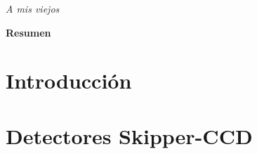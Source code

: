 \documentclass[a4paper,12pt]{report}
\begin{document}
\newpage
\thispagestyle{empty}
 \vspace*{150pt}
\begin{flushright}
\textit{A mis viejos}
\end{flushright}
\newpage
\thispagestyle{empty} \mbox{}
\thispagestyle{empty}


\newpage
\thispagestyle{empty}
\begin{center}\large{\textbf{Resumen}}\end{center}


\newpage
\thispagestyle{empty} \mbox{}
\thispagestyle{empty}

\newpage
{} %
\setcounter{page}{1}  %
\tableofcontents %
\newpage
\thispagestyle{empty} \mbox{}
\thispagestyle{empty}

\newpage
{}  %
\setcounter{page}{1}    %
\singlespace
\chapter{Introducción}


\singlespace
\chapter{Detectores Skipper-CCD}
\label{cap:detectores}

\end{document}
